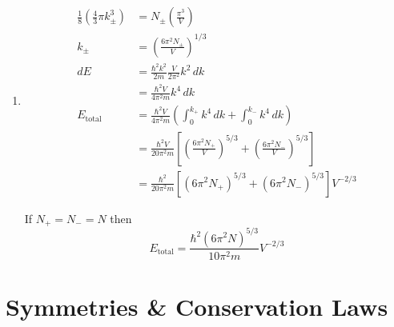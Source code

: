 \documentclass{article}
\begin{document}
\setcounter{subsection}{31}
\subsection{}

\begin{enumerate}
  \item

        \begin{align*}
          \frac{1}{8} \left( \frac{4}{3} \pi k_\pm^3 \right) & = N_\pm \left( \frac{\pi^3}{V} \right)                                                                                                    \\
          k_\pm                                              & = \left( \frac{6 \pi^2 N_\pm}{V} \right)^{1 / 3}                                                                                          \\
          d E                                                & = \frac{\hbar^2 k^2}{2 m} \frac{V}{2 \pi^2} k^2 \,d k                                                                                     \\
                                                             & = \frac{\hbar^2 V}{4 \pi^2 m} k^4 \,d k                                                                                                   \\
          E_\text{total}                                     & = \frac{\hbar^2 V}{4 \pi^2 m} \left( \int_0^{k_+} k^4 \,d k + \int_0^{k_-} k^4 \,d k \right)                                              \\
                                                             & = \frac{\hbar^2 V}{20 \pi^2 m} \left[ \left( \frac{6 \pi^2 N_+}{V} \right)^{5 / 3} + \left( \frac{6 \pi^2 N_-}{V} \right)^{5 / 3} \right] \\
                                                             & = \frac{\hbar^2}{20 \pi^2 m} [(6 \pi^2 N_+)^{5 / 3} + (6 \pi^2 N_-)^{5 / 3}] V^{-2 / 3}
        \end{align*}

        If $N_+ = N_- = N$ then \[E_\text{total} = \frac{\hbar^2 (6 \pi^2 N)^{5 / 3}}{10 \pi^2 m} V^{-2 / 3}\]
\end{enumerate}

\section{Symmetries \& Conservation Laws}
\end{document}
